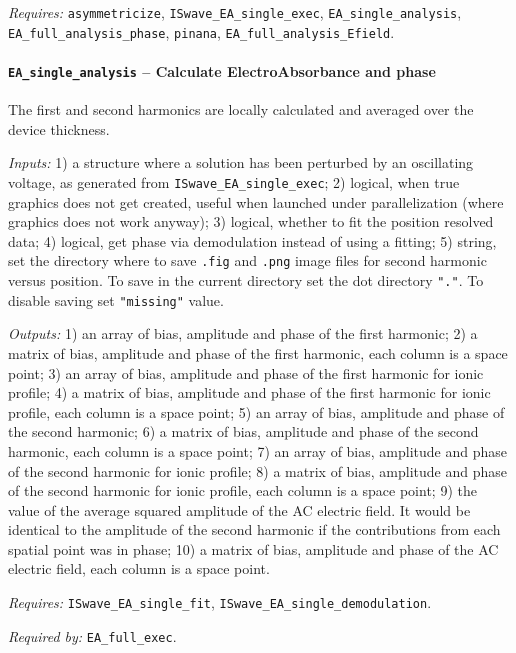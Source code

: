 \textit{Requires:} \texttt{asymmetricize}, \texttt{ISwave\_EA\_single\_exec},
\texttt{EA\_single\_analysis}, \texttt{EA\_full\_analysis\_phase}, \texttt{pinana}, \texttt{EA\_full\_analysis\_Efield}.


\paragraph{\texttt{EA\_single\_analysis} -- Calculate ElectroAbsorbance and phase}
The first and second harmonics are locally calculated and averaged over the device thickness.

\textit{Inputs:} 1) a structure where a solution has been perturbed by an
oscillating voltage, as generated from \texttt{ISwave\_EA\_single\_exec};
2) logical, when true graphics does not get created, useful when
launched under parallelization (where graphics does not work anyway);
3) logical, whether to fit the position resolved data;
4) logical, get phase via demodulation instead of using a fitting;
5) string, set the directory where to save \texttt{.fig} and \texttt{.png}
image files for second harmonic versus position.
To save in the current directory set the dot directory \texttt{"."}.
To disable saving set \texttt{"missing"} value.

\textit{Outputs:} 1) an array of bias, amplitude and phase of the first
harmonic;
2) a matrix of bias, amplitude and phase of the first
harmonic, each column is a space point;
3) an array of bias, amplitude and phase of the first
harmonic for ionic profile;
4) a matrix of bias, amplitude and phase of the first
harmonic for ionic profile, each column is a space point;
5) an array of bias, amplitude and phase of the second
harmonic;
6) a matrix of bias, amplitude and phase of the second
harmonic, each column is a space point;
7) an array of bias, amplitude and phase of the second
harmonic for ionic profile;
8) a matrix of bias, amplitude and phase of the second
harmonic for ionic profile, each column is a space point;
9) the value of the average squared amplitude of the
AC electric field. It would be identical to the amplitude of the
second harmonic if the contributions from each spatial point was in
phase;
10) a matrix of bias, amplitude and phase of the AC electric
field, each column is a space point.

\textit{Requires:} \texttt{ISwave\_EA\_single\_fit}, \texttt{ISwave\_EA\_single\_demodulation}.

\textit{Required by:} \texttt{EA\_full\_exec}.



